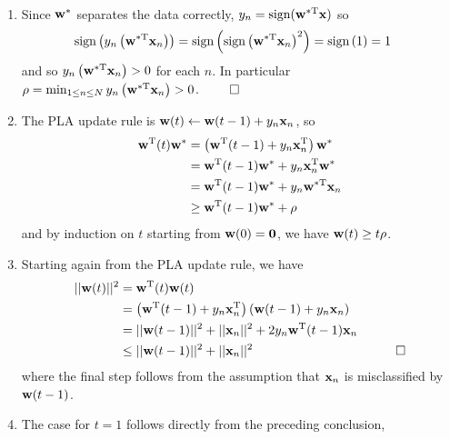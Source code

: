 \documentclass{amsart}
\begin{document}
\begin{solution}\ 
  \begin{enumerate}
    \item Since \({\bf w}^*\) separates the data correctly,
      \(y_n = \textup{sign}({\bf w}^{*\textup{T}}{\bf x})\) so
      \begin{align*}
        \textup{sign}\left(y_n\left({\bf w}^{*\textup{T}}{\bf x}_n\right)\right)
          &= \textup{sign}\left(
            \textup{sign}\left({\bf w}^{*\textup{T}}{\bf x}_n\right)^2
            \right) = \textup{sign}\left(1\right) = 1
      \end{align*}
      and so \(y_n\left({\bf w}^{*\textup{T}}{\bf x}_n\right) > 0\) for each
      \(n\). In particular \(\rho = \min_{1\leq n\leq N}
      y_n\left({\bf w}^{*\textup{T}}{\bf x}_n\right) > 0\). \(\qed\)
    \item The PLA update rule is \({\bf w}(t)\leftarrow{\bf w}(t-1)+y_n{\bf x}_n\),
      so
      \begin{align*}
        {\bf w}^\textup{T}(t){\bf w}^* &=
          \left({\bf w}^\textup{T}(t-1)+y_n{\bf x}^\textup{T}_n\right){\bf w}^*
            \\
          &= {\bf w}^\textup{T}(t-1){\bf w}^*+y_n{\bf x}^\textup{T}_n{\bf w}^*
            \\
          &= {\bf w}^\textup{T}(t-1){\bf w}^*+y_n{\bf w}^{*\textup{T}}{\bf x}_n
            \\
          &\geq {\bf w}^\textup{T}(t-1){\bf w}^*+\rho
      \end{align*}
      and by induction on \(t\) starting from \({\bf w}(0) = {\bf 0}\), we have
      \({\bf w}(t) \geq t\rho\).
    \item Starting again from the PLA update rule, we have
      \begin{align*}
        ||{\bf w}(t)||^2 &= {\bf w}^\textup{T}(t){\bf w}(t) & & \\
        &=\left({\bf w}^\textup{T}(t-1)+y_n{\bf x}^\textup{T}_n\right)
          \left({\bf w}(t-1)+y_n{\bf x}_n\right) & & \\
        &= ||{\bf w}(t-1)||^2 + ||{\bf x}_n||^2 +
          2y_n{\bf w}^\textup{T}(t-1){\bf x}_n & & \\
        &\leq ||{\bf w}(t-1)||^2 + ||{\bf x}_n||^2 & &\qed
      \end{align*}
      where the final step follows from the assumption that \({\bf x}_n\) is
      misclassified by \({\bf w}(t-1)\).
    \item The case for \(t=1\) follows directly from the preceding conclusion,

\end{enumerate}
\end{solution}
\end{document}
